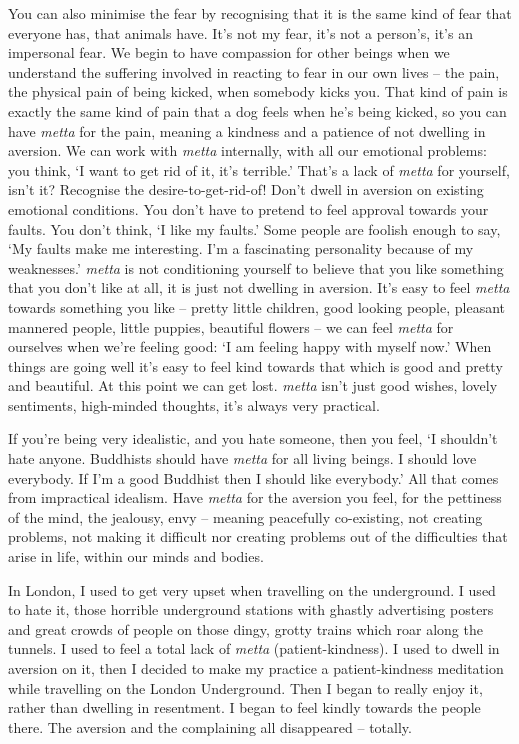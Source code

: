 You can also minimise the fear by recognising that it is the same kind of fear that everyone has, that animals have. It's not my fear, it's not a person's, it's an impersonal fear. We begin to have compassion for other beings when we understand the suffering involved in reacting to fear in our own lives -- the pain, the physical pain of being kicked, when somebody kicks you. That kind of pain is exactly the same kind of pain that a dog feels when he's being kicked, so you can have \textit{metta} for the pain, meaning a kindness and a patience of not dwelling in aversion. We can work with \textit{metta} internally, with all our emotional problems: you think, `I want to get rid of it, it's terrible.' That's a lack of \textit{metta} for yourself, isn't it? Recognise the desire-to-get-rid-of! Don't dwell in aversion on existing emotional conditions. You don't have to pretend to feel approval towards your faults. You don't think, `I like my faults.' Some people are foolish enough to say, `My faults make me interesting. I'm a fascinating personality because of my weaknesses.' \textit{metta} is not conditioning yourself to believe that you like something that you don't like at all, it is just not dwelling in aversion. It's easy to feel \textit{metta} towards something you like -- pretty little children, good looking people, pleasant mannered people, little puppies, beautiful flowers -- we can feel \textit{metta} for ourselves when we're feeling good: `I am feeling happy with myself now.' When things are going well it's easy to feel kind towards that which is good and pretty and beautiful. At this point we can get lost. \textit{metta} isn't just good wishes, lovely sentiments, high-minded thoughts, it's always very practical.

If you're being very idealistic, and you hate someone, then you feel, `I shouldn't hate anyone. Buddhists should have \textit{metta} for all living beings. I should love everybody. If I'm a good Buddhist then I should like everybody.' All that comes from impractical idealism. Have \textit{metta} for the aversion you feel, for the pettiness of the mind, the jealousy, envy -- meaning peacefully co-existing, not creating problems, not making it difficult nor creating problems out of the difficulties that arise in life, within our minds and bodies.

In London, I used to get very upset when travelling on the underground. I used to hate it, those horrible underground stations with ghastly advertising posters and great crowds of people on those dingy, grotty trains which roar along the tunnels. I used to feel a total lack of \textit{metta} (patient-kindness). I used to dwell in aversion on it, then I decided to make my practice a patient-kindness meditation while travelling on the London Underground. Then I began to really enjoy it, rather than dwelling in resentment. I began to feel kindly towards the people there. The aversion and the complaining all disappeared -- totally.


